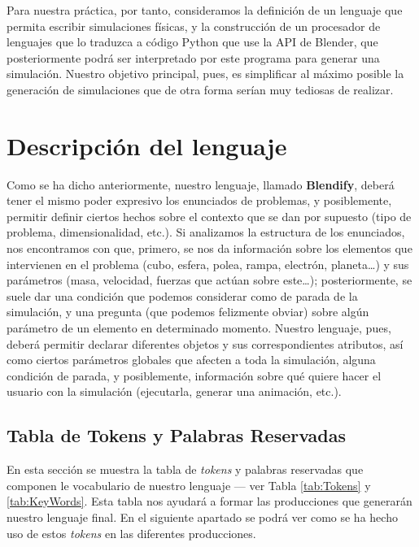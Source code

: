 \documentclass[12pt]{article}
\begin{document}
Para nuestra práctica, por tanto, consideramos la definición de un lenguaje que permita escribir simulaciones físicas, y la construcción de un procesador de lenguajes que lo traduzca a código Python que use la API de Blender, que posteriormente podrá ser interpretado por este programa para generar una simulación. Nuestro objetivo principal, pues, es simplificar al máximo posible la generación de simulaciones que de otra forma serían muy tediosas de realizar.

\section{Descripción del lenguaje}

Como se ha dicho anteriormente, nuestro lenguaje, llamado \textbf{Blendify}, deberá tener el mismo poder expresivo los enunciados de problemas, y posiblemente, permitir definir ciertos hechos sobre el contexto que se dan por supuesto (tipo de problema, dimensionalidad, etc.). Si analizamos la estructura de los enunciados, nos encontramos con que, primero, se nos da información sobre los elementos que intervienen en el problema (cubo, esfera, polea, rampa, electrón, planeta…) y sus parámetros (masa, velocidad, fuerzas que actúan sobre este…); posteriormente, se suele dar una condición que podemos considerar como de parada de la simulación, y una pregunta (que podemos felizmente obviar) sobre algún parámetro de un elemento en determinado momento. Nuestro lenguaje, pues, deberá permitir declarar diferentes objetos y sus correspondientes atributos, así como ciertos parámetros globales que afecten a toda la simulación, alguna condición de parada, y posiblemente, información sobre qué quiere hacer el usuario con la simulación (ejecutarla, generar una animación, etc.).

\subsection{Tabla de Tokens y Palabras Reservadas}

En esta sección se muestra la tabla de \textit{tokens} y palabras reservadas que componen le vocabulario de nuestro lenguaje ---  ver Tabla \ref{tab:Tokens} y \ref{tab:KeyWords}. Esta tabla nos ayudará a formar las producciones que generarán nuestro lenguaje final. En el siguiente apartado se podrá ver como se ha hecho uso de estos \textit{tokens} en las diferentes producciones.
\end{document}
